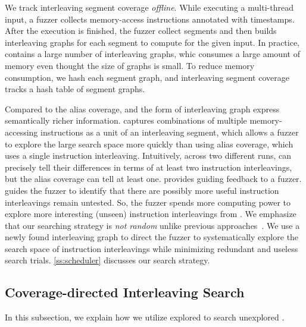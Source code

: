 We track interleaving segment coverage \textit{offline}. While
executing a multi-thread input, a fuzzer collects memory-access
instructions annotated with timestamps. After the execution is
finished, the fuzzer collect segments and then builds interleaving 
graphs for each segment to compute \intcov for the given input.
In practice, \intcov contains a large number of interleaving graphs, 
whic consumes a large amount of memory even thought the size of graphs is 
small.
To reduce memory consumption, we hash each segment graph,
and interleaving segment coverage tracks a hash table of segment
graphs.
%





Compared to the alias coverage, \intcov and the form of interleaving graph
express semantically richer information. \Intcov captures combinations 
of multiple memory-accessing instructions as a unit of an interleaving segment, which allows a fuzzer to explore the large search space more quickly than using alias coverage, which uses a single instruction interleaving. Intuitively, across two different runs, \intcov can precisely tell 
their differences in terms of at least two instruction interleavings, 
but the alias coverage can tell at least one.
\Intcov provides guiding feedback to a fuzzer.
\Intcov guides the fuzzer to identify that there are possibly more useful instruction interleavings remain untested. So, the fuzzer spends
more computing power to explore more interesting (unseen) instruction interleavings from \intcov. We emphasize that our searching strategy is 
\textit{not random} unlike previous approaches~\cite{krace, ski, pctalgorithm, muzz}.
%
We use a newly found interleaving graph to
direct the fuzzer to systematically explore the search space of
instruction interleavings while minimizing redundant and useless
search trials. \autoref{ss:scheduler} discusses our search strategy.


\subsection{Coverage-directed Interleaving Search}
\label{ss:scheduler}
%
In this subsection, we explain how we utilize explored \intcov to
search unexplored \intcov.

